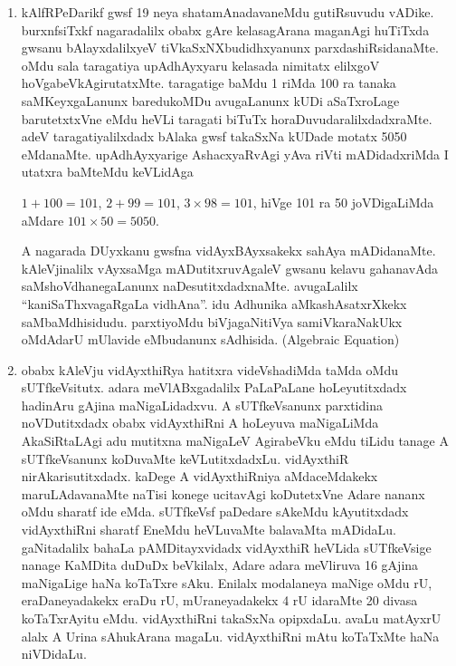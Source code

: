 \begin{enumerate}[\rm 1)]
\item kAlfRPeDarikf gwsf {\rm 19} neya shatamAnadavaneMdu gutiRsuvudu vADike. burxnfsiTxkf nagaradalilx obabx gAre kelasagArana maganAgi huTiTxda gwsanu bAlayxdalilxyeV tiVkaSxNXbudidhxyanunx parxdashiRsidanaMte. oMdu sala taragatiya upAdhAyxyaru kelasada nimitatx elilxgoV hoVgabeVkAgirutatxMte. taragatige baMdu {\rm 1} riMda {\rm 100} ra tanaka saMKeyxgaLanunx baredukoMDu avugaLanunx kUDi aSaTxroLage barutetxtxVne eMdu heVLi taragati biTuTx horaDuvudaralilxdadxraMte. adeV taragatiyalilxdadx bAlaka gwsf takaSxNa kUDade motatx {\rm 5050} eMdanaMte. upAdhAyxyarige AshacxyaRvAgi yAva riVti mADidadxriMda I utatxra baMteMdu keVLidAga

$1+100=101$, $2+99=101$, $3\times 98=101$, hiVge {\rm 101} ra {\rm 50} joVDigaLiMda aMdare  $101\times 50=5050$.

A nagarada DUyxkanu gwsfna vidAyxBAyxsakekx sahAya mADidanaMte. kAleVjinalilx vAyxsaMga mADutitxruvAgaleV gwsanu kelavu gahanavAda saMshoVdhanegaLanunx naDesutitxdadxnaMte. avugaLalilx ``kaniSaThxvagaRgaLa vidhAna''. idu Adhunika aMkashAsatxrXkekx saMbaMdhisidudu. parxtiyoMdu biVjagaNitiVya samiVkaraNakUkx oMdAdarU mUlavide eMbudanunx sAdhisida. {\rm (Algebraic Equation)}  

\item obabx kAleVju vidAyxthiRya hatitxra videVshadiMda taMda oMdu sUTfkeVsitutx. adara meVlABxgadalilx PaLaPaLane hoLeyutitxdadx hadinAru gAjina maNigaLidadxvu. A sUTfkeVsanunx parxtidina noVDutitxdadx obabx vidAyxthiRni A hoLeyuva maNigaLiMda AkaSiRtaLAgi adu mutitxna maNigaLeV AgirabeVku eMdu tiLidu tanage A sUTfkeVsanunx koDuvaMte keVLutitxdadxLu. vidAyxthiR nirAkarisutitxdadx. kaDege A vidAyxthiRniya aMdaceMdakekx maruLAdavanaMte naTisi konege ucitavAgi koDutetxVne Adare nananx oMdu sharatf ide eMda. sUTfkeVsf paDedare sAkeMdu kAyutitxdadx vidAyxthiRni sharatf EneMdu heVLuvaMte balavaMta mADidaLu. gaNitadalilx bahaLa pAMDitayxvidadx vidAyxthiR heVLida sUTfkeVsige nanage  KaMDita duDuDx beVkilalx, Adare adara meVliruva {\rm 16} gAjina maNigaLige haNa koTaTxre sAku. Enilalx modalaneya maNige oMdu rU, eraDaneyadakekx eraDu rU, mUraneyadakekx {\rm 4} rU idaraMte {\rm 20} divasa koTaTxrAyitu eMdu. vidAyxthiRni takaSxNa opipxdaLu. avaLu matAyxrU alalx A Urina sAhukArana magaLu. vidAyxthiRni mAtu koTaTxMte haNa niVDidaLu.


\end{enumerate}
